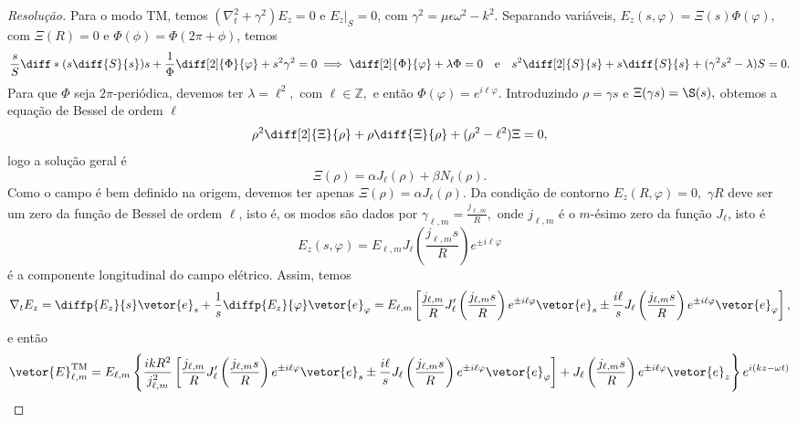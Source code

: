 \begin{proof}[Resolução]
    Para o modo TM, temos \((\nabla_t^2 + \gamma^2)E_z = 0\) e \(\left.E_z\right|_S = 0\), com \(\gamma^2 = \mu \epsilon \omega^2 - k^2\). Separando variáveis, \(E_z(s, \varphi) = \Xi(s) \Phi(\varphi),\) com \(\Xi(R) = 0\) e \(\Phi(\phi) = \Phi(2\pi + \phi)\), temos
    \begin{equation*}
        \frac{s}{S} \diff*{\left(s \diff{S}{s}\right)}{s} + \frac{1}{\Phi} \diff[2]{\Phi}{\varphi} + s^2\gamma^2 = 0 \implies
        \diff[2]{\Phi}{\varphi} + \lambda \Phi = 0\quad\text{e}\quad s^2 \diff[2]{S}{s} + s \diff{S}{s} + (\gamma^2 s^2 - \lambda) S = 0.
    \end{equation*}
    Para que \(\Phi\) seja \(2\pi\)-periódica, devemos ter \(\lambda = \ell^2,\) com \(\ell \in \mathbb{Z},\) e então \(\Phi(\varphi) = e^{i\ell \varphi}.\) Introduzindo \(\rho = \gamma s\) e \(\Xi(\gamma s) = \S(s),\) obtemos a equação de Bessel de ordem \(\ell\)
    \begin{equation*}
        \rho^2 \diff[2]{\Xi}{\rho} + \rho \diff{\Xi}{\rho} + (\rho^2 - \ell^2) \Xi = 0,
    \end{equation*}
    logo a solução geral é 
    \begin{equation*}
        \Xi(\rho) = \alpha J_\ell(\rho) + \beta N_\ell(\rho).
    \end{equation*}
    Como o campo é bem definido na origem, devemos ter apenas \(\Xi(\rho) = \alpha J_\ell(\rho)\).
    Da condição de contorno \(E_z(R, \varphi) = 0,\) \(\gamma R\) deve ser um zero da função de Bessel de ordem \(\ell\), isto é, os modos são dados por \(\gamma_{\ell, m} = \frac{j_{\ell,m}}{R},\) onde \(j_{\ell,m}\) é o \(m\)-ésimo zero da função \(J_\ell\), isto é
    \begin{equation*}
        E_z(s, \varphi) = E_{\ell,m}J_\ell\left(\frac{j_{\ell, m} s}{R}\right) e^{\pm i \ell \varphi}
    \end{equation*}
    é a componente longitudinal do campo elétrico. Assim, temos
    \begin{equation*}
        \nabla_t E_z = \diffp{E_z}{s} \vetor{e}_s + \frac{1}{s}\diffp{E_z}{\varphi} \vetor{e}_\varphi = E_{\ell, m}\left[\frac{j_{\ell, m}}{R} J_\ell'\left(\frac{j_{\ell,m} s}{R}\right)e^{\pm i \ell \varphi} \vetor{e}_s \pm \frac{i \ell}{s} J_\ell\left(\frac{j_{\ell,m} s}{R}\right)e^{\pm i \ell \varphi}\vetor{e}_\varphi\right],
    \end{equation*}
    e então
    \begin{equation*}
        \vetor{E}^{\mathrm{TM}}_{\ell,m} = E_{\ell, m}\left\{\frac{i kR^2}{j_{\ell, m}^2}\left[\frac{j_{\ell, m}}{R} J_\ell'\left(\frac{j_{\ell,m} s}{R}\right)e^{\pm i \ell \varphi} \vetor{e}_s \pm \frac{i \ell}{s} J_\ell\left(\frac{j_{\ell,m} s}{R}\right)e^{\pm i \ell \varphi}\vetor{e}_\varphi\right] + J_\ell\left(\frac{j_{\ell, m} s}{R}\right) e^{\pm i \ell \varphi}\vetor{e}_z\right\}e^{i(kz - \omega t)}

\end{equation*}
\end{proof}
